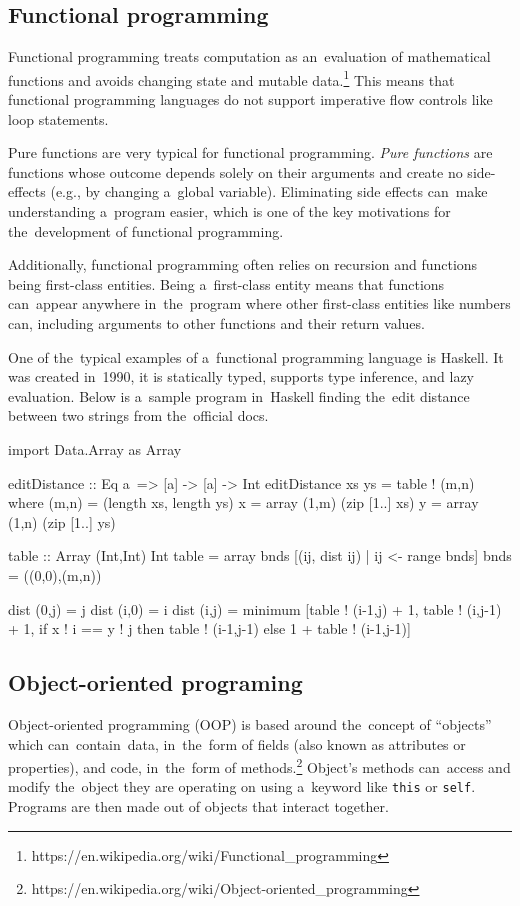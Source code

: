\subsection{Functional programming}
Functional programming treats computation as an~evaluation of mathematical functions and avoids changing state and mutable
data.\footnote{https://en.wikipedia.org/wiki/Functional\_programming}
This means that functional programming languages do not support imperative flow controls like loop statements.

Pure functions are very typical for functional programming. \emph{Pure functions} are functions whose outcome depends solely on their arguments
and create no side-effects (e.g., by changing a~global variable). Eliminating side effects can~make understanding a~program easier, which is one of the
key motivations for the~development of functional programming.

Additionally, functional programming often relies on recursion and functions being first-class entities. Being a~first-class entity means that functions can~appear
anywhere in~the~program where other first-class entities like numbers can, including arguments to other functions and their return values.

One of the~typical examples of a~functional programming language is Haskell. It was created in~1990, it is statically typed, supports type inference,
and lazy evaluation. Below is a~sample program in~Haskell finding the~edit distance between two strings from the~official docs.
\begin{code}
import Data.Array as Array

editDistance :: Eq a~=> [a] -> [a] -> Int
editDistance xs ys = table ! (m,n)
    where
    (m,n) = (length xs, length ys)
    x     = array (1,m) (zip [1..] xs)
    y     = array (1,n) (zip [1..] ys)
    
    table :: Array (Int,Int) Int
    table = array bnds [(ij, dist ij) | ij <- range bnds]
    bnds  = ((0,0),(m,n))
    
    dist (0,j) = j
    dist (i,0) = i
    dist (i,j) = minimum [table ! (i-1,j) + 1, table ! (i,j-1) + 1,
        if x ! i == y ! j
            then table ! (i-1,j-1)
            else 1 + table ! (i-1,j-1)]
\end{code}

\subsection{Object-oriented programing}
Object-oriented programming (OOP) is based around the~concept of ``objects'' which can~contain~data, in~the~form of fields (also known as attributes or properties),
and code, in~the~form of methods.\footnote{https://en.wikipedia.org/wiki/Object-oriented\_programming} Object's methods can~access and modify the~object they are
operating on using a~keyword like \texttt{this} or \texttt{self}. Programs are then made out of objects that interact together.

